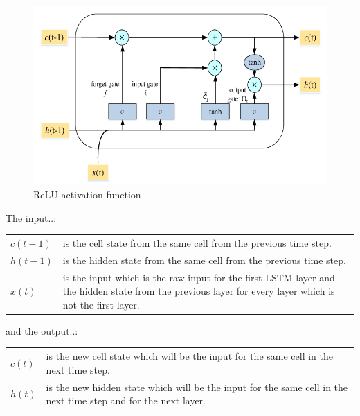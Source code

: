 \documentclass[a4paper,12pt]{report}
\begin{document}
\begin{figure}[htbp]
  \centering
  \includegraphics[width=\textwidth]{images/LSTM.png}
  \caption{ReLU activation function}
  \label{fig:fullwidth}
\end{figure}

	
	
\begin{minipage}{\textwidth}
	The input..:\\
\medskip
\begin{tabularx}{\textwidth}{@{}l@{\hspace{2em}--\hspace{2em}}X@{}}
  $c(t-1)$ & is the cell state from the same cell from the previous time step. \\
  $h(t-1)$ & is the hidden state from the same cell from the previous time step. \\
  $x(t)$   & is the input which is the raw input for the first LSTM layer and the hidden state from the previous layer for every layer which is not the first layer. \\
\end{tabularx}


\end{minipage}

\begin{minipage}{\textwidth}

	and the output..:\\


\begin{tabularx}{\textwidth}{@{}l@{\hspace{2em}--\hspace{2em}}X@{}}
  $c(t)$ & is the new cell state which will be the input for the same cell in the next time step. \\
  $h(t)$ & is the new hidden state which will be the input for the same cell in the next time step and for the next layer. \\
\end{tabularx}\\
\end{minipage}
\end{document}

